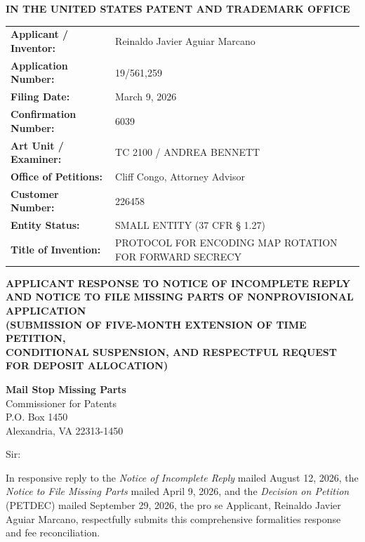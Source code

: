 \documentclass[11pt,letterpaper]{article}
\begin{document}
\thispagestyle{empty}

\begin{center}
    \textbf{\large IN THE UNITED STATES PATENT AND TRADEMARK OFFICE}
\end{center}

\vspace{0.3cm}
\noindent\begin{tabular}{p{2.3in}p{4.0in}}
\textbf{Applicant / Inventor:} & Reinaldo Javier Aguiar Marcano \\
\textbf{Application Number:} & 19/561,259 \\
\textbf{Filing Date:} & March 9, 2026 \\
\textbf{Confirmation Number:} & 6039 \\
\textbf{Art Unit / Examiner:} & TC 2100 / ANDREA BENNETT \\
\textbf{Office of Petitions:} & Cliff Congo, Attorney Advisor \\
\textbf{Customer Number:} & 226458 \\
\textbf{Entity Status:} & SMALL ENTITY (37 CFR \S{} 1.27) \\
\textbf{Title of Invention:} & PROTOCOL FOR ENCODING MAP ROTATION FOR FORWARD SECRECY \\
\end{tabular}

\vspace{0.4cm}
\begin{center}
    \textbf{\large APPLICANT RESPONSE TO NOTICE OF INCOMPLETE REPLY \\
    AND NOTICE TO FILE MISSING PARTS OF NONPROVISIONAL APPLICATION} \\
    \textbf{\normalsize (SUBMISSION OF FIVE-MONTH EXTENSION OF TIME PETITION, \\
    CONDITIONAL SUSPENSION, AND RESPECTFUL REQUEST FOR DEPOSIT ALLOCATION)}
\end{center}

\noindent\textbf{Mail Stop Missing Parts} \\
Commissioner for Patents \\
P.O. Box 1450 \\
Alexandria, VA 22313-1450

\vspace{0.2cm}
Sir:

In responsive reply to the \textit{Notice of Incomplete Reply} mailed August 12, 2026, the \textit{Notice to File Missing Parts} mailed April 9, 2026, and the \textit{Decision on Petition} (PETDEC) mailed September 29, 2026, the pro se Applicant, Reinaldo Javier Aguiar Marcano, respectfully submits this comprehensive formalities response and fee reconciliation.
\end{document}
